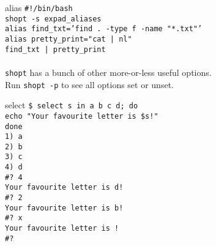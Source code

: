 \documentclass{beamer}
\let\tt\texttt
\begin{document}
\begin{frame}{alias}
        \tt{\#!/bin/bash}                                   \\
        \tt{shopt -s expad\_aliases}                        \\
        \tt{alias find\_txt='find . -type f -name "*.txt"'} \\
        \tt{alias pretty\_print="cat | nl"}                 \\
        \tt{find\_txt | pretty\_print}                      \\
        \quad                                               \\
        \tt{shopt} has a bunch of other more-or-less useful options.    \\
        Run \tt{shopt -p} to see all options set or unset.
\end{frame}

\begin{frame}{select}
        \tt{\$ select s in a b c d; do}                   \\
        \quad \tt{echo "Your favourite letter is \$s!"}     \\ 
        \tt{done}   \\
        \tt{1) a}   \\
        \tt{2) b}   \\
        \tt{3) c}   \\
        \tt{4) d}   \\
        \tt{\#? 4}  \\
        \tt{Your favourite letter is d!}      \\
        \tt{\#? 2}  \\
        \tt{Your favourite letter is b!}      \\
        \tt{\#? x}  \\
        \tt{Your favourite letter is !}      \\
        \tt{\#? }   \\
\end{frame}
\end{document}

